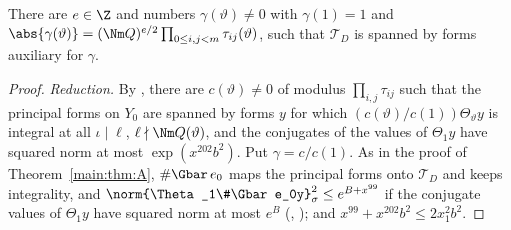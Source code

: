 \begin{theorem}
\label{det-chain:thm:aux}
There are $e\in\Z$ and numbers $\gamma(\vartheta)\ne0$ with $\gamma(1)=1$ and
$\abs{\gamma(\vartheta)}=(\Nm Q)^{e/2}\prod_{0\le i,j<m}\tau_{ij}(\vartheta)$, such that
$\mathcal{T}_D$ is spanned by forms auxiliary for $\gamma$.
\end{theorem}

\begin{proof}
\emph{Reduction.} By , there are $c(\vartheta)\ne0$
of modulus $\prod_{i,j}\tau_{ij}$ such that the principal forms on $Y_0$ are spanned by forms $y$
for which $(c(\vartheta)/c(1))\Theta_\vartheta y$ is integral at all $\iota\mid\ell$,
$\ell\nmid\Nm Q(\vartheta)$, and the conjugates of the values of $\Theta_1y$ have squared norm at
most $\exp(x^{202}b^2)$. Put $\gamma=c/c(1)$. As in the proof of Theorem~\ref{main:thm:A},
$\#\Gbar\,e_0$ maps the principal forms onto $\mathcal{T}_D$ and keeps integrality, and
$\norm{\Theta_1\#\Gbar e_0y}_\sigma^2\le e^{B+x^{99}}$ if the conjugate values of $\Theta_1y$ have
squared norm at most $e^B$
(,
); and $x^{99}+x^{202}b^2\le2x_1^2b^2$.


\end{proof}
